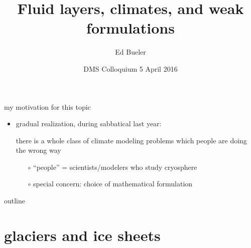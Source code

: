 \documentclass[xcolor={dvipsnames}]{beamer}
\title{Fluid layers, climates, and weak formulations}
\author{Ed Bueler}
\institute[UAF] %
{
  Dept of Mathematics and Statistics, and Geophysical Institute\\
  University of Alaska Fairbanks \\
  \tiny (\emph{funded by NASA Modeling, Analysis, and Prediction program})%
}
\date{DMS Colloquium 5 April 2016}
\begin{document}
\graphicspath{{../domains/}{../obstacle/}{../cartoon/}{../refinemass/}{../../images/}{../../../talks-public/commonfigs/}{../../../sia-fve/talks/}}

\begin{frame}
  \titlepage
\end{frame}


\begin{frame}{my motivation for this topic}
\begin{itemize}
\item gradual realization, during sabbatical last year:
\begin{center}
\alert{there is a whole class of climate modeling problems which people are doing the wrong way}
\end{center}
  \begin{itemize}
  \item[$\circ$] ``people'' = scientists/modelers who study cryosphere
  \item[$\circ$] special concern: choice of mathematical formulation
  \end{itemize}
\end{itemize}

\end{frame}


\begin{frame}{outline}
  \tableofcontents
\end{frame}


\section{glaciers and ice sheets}
\end{document}
